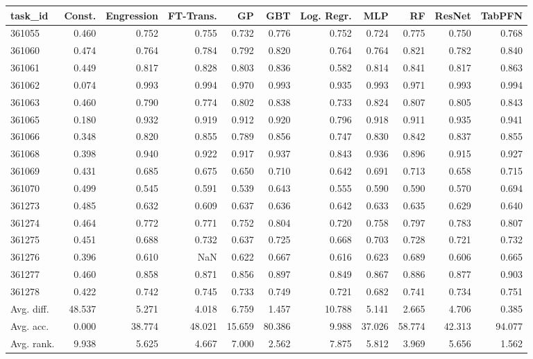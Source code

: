 \begin{tabular}{lrrrrrrrrrr}
\toprule
task\_id & Const. & Engression & FT-Trans. & GP & GBT & Log. Regr. & MLP & RF & ResNet & TabPFN \\
\midrule
361055 & 0.460 & 0.752 & 0.755 & 0.732 & 0.776 & 0.752 & 0.724 & 0.775 & 0.750 & 0.768 \\
361060 & 0.474 & 0.764 & 0.784 & 0.792 & 0.820 & 0.764 & 0.764 & 0.821 & 0.782 & 0.840 \\
361061 & 0.449 & 0.817 & 0.828 & 0.803 & 0.836 & 0.582 & 0.814 & 0.841 & 0.817 & 0.863 \\
361062 & 0.074 & 0.993 & 0.994 & 0.970 & 0.993 & 0.935 & 0.993 & 0.971 & 0.993 & 0.994 \\
361063 & 0.460 & 0.790 & 0.774 & 0.802 & 0.838 & 0.733 & 0.824 & 0.807 & 0.805 & 0.843 \\
361065 & 0.180 & 0.932 & 0.919 & 0.912 & 0.920 & 0.796 & 0.918 & 0.911 & 0.935 & 0.941 \\
361066 & 0.348 & 0.820 & 0.855 & 0.789 & 0.856 & 0.747 & 0.830 & 0.842 & 0.837 & 0.855 \\
361068 & 0.398 & 0.940 & 0.922 & 0.917 & 0.937 & 0.843 & 0.936 & 0.896 & 0.915 & 0.927 \\
361069 & 0.431 & 0.685 & 0.675 & 0.650 & 0.710 & 0.642 & 0.691 & 0.713 & 0.658 & 0.715 \\
361070 & 0.499 & 0.545 & 0.591 & 0.539 & 0.643 & 0.555 & 0.590 & 0.590 & 0.570 & 0.694 \\
361273 & 0.485 & 0.632 & 0.609 & 0.637 & 0.636 & 0.642 & 0.633 & 0.635 & 0.629 & 0.640 \\
361274 & 0.464 & 0.772 & 0.771 & 0.752 & 0.804 & 0.720 & 0.758 & 0.797 & 0.783 & 0.807 \\
361275 & 0.451 & 0.688 & 0.732 & 0.637 & 0.725 & 0.668 & 0.703 & 0.728 & 0.721 & 0.732 \\
361276 & 0.396 & 0.610 & NaN & 0.622 & 0.667 & 0.616 & 0.623 & 0.689 & 0.606 & 0.665 \\
361277 & 0.460 & 0.858 & 0.871 & 0.856 & 0.897 & 0.849 & 0.867 & 0.886 & 0.877 & 0.903 \\
361278 & 0.422 & 0.742 & 0.745 & 0.733 & 0.749 & 0.721 & 0.682 & 0.741 & 0.734 & 0.751 \\
Avg. diff. & 48.537 & 5.271 & 4.018 & 6.759 & 1.457 & 10.788 & 5.141 & 2.665 & 4.706 & 0.385 \\
Avg. acc. & 0.000 & 38.774 & 48.021 & 15.659 & 80.386 & 9.988 & 37.026 & 58.774 & 42.313 & 94.077 \\
Avg. rank. & 9.938 & 5.625 & 4.667 & 7.000 & 2.562 & 7.875 & 5.812 & 3.969 & 5.656 & 1.562 \\
\bottomrule
\end{tabular}
